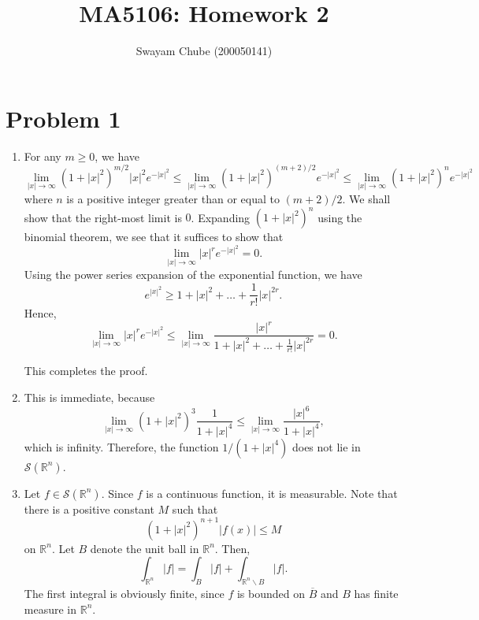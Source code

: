 \documentclass[12pt]{amsart}
\title{MA5106: Homework 2}
\author{Swayam Chube (200050141)}
\newcommand{\R}{\mathbb{R}}
\begin{document}
\maketitle 

\section*{Problem 1}

\begin{enumerate}[label=(\alph*)]
    \item For any $m\ge 0$, we have 
    \begin{equation*}
        \lim_{|x|\to\infty}(1 + |x|^2)^{m/2} |x|^2e^{-|x|^2}\le\lim_{|x|\to\infty}(1 + |x|^2)^{(m + 2)/2}e^{-|x|^2}\le\lim_{|x|\to\infty}(1 + |x|^2)^{n}e^{-|x|^2}
    \end{equation*}
    where $n$ is a positive integer greater than or equal to $(m + 2)/2$. We shall show that the right-most limit is $0$. Expanding $(1 + |x|^2)^n$ using the binomial theorem, we see that it suffices to show that 
    \begin{equation*}
        \lim_{|x|\to\infty} |x|^r e^{-|x|^2} = 0.
    \end{equation*}
    Using the power series expansion of the exponential function, we have 
    \begin{equation*}
        e^{|x|^2}\ge 1 + |x|^2 + \dots + \frac{1}{r!}|x|^{2r}.
    \end{equation*}
    Hence,
    \begin{equation*}
        \lim_{|x|\to\infty}|x|^r e^{-|x|^2}\le\lim_{|x|\to\infty}\frac{|x|^r}{1 + |x|^2 + \dots + \frac{1}{r!}|x|^{2r}} = 0.
    \end{equation*}

    This completes the proof.

    \item This is immediate, because 
    \begin{equation*}
        \lim_{|x|\to\infty} (1 + |x|^2)^3\frac{1}{1 + |x|^4}\le\lim_{|x|\to\infty}\frac{|x|^6}{1 + |x|^4},
    \end{equation*}
    which is infinity. Therefore, the function $1/(1 + |x|^4)$ does not lie in $\mathcal S(\R^n)$.

    \item Let $f\in\mathcal S(\R^n)$. Since $f$ is a continuous function, it is measurable. Note that there is a positive constant $M$ such that 
    \begin{equation*}
        (1 + |x|^2)^{n + 1} |f(x)|\le M
    \end{equation*}
    on $\R^n$. Let $B$ denote the unit ball in $\R^n$. Then,
    \begin{equation*}
        \int_{\R^n} |f| = \int_B |f| + \int_{\R^n\backslash B} |f|.
    \end{equation*}
    The first integral is obviously finite, since $f$ is bounded on $\overline B$ and $B$ has finite measure in $\R^n$.


\end{enumerate}
\end{document}
